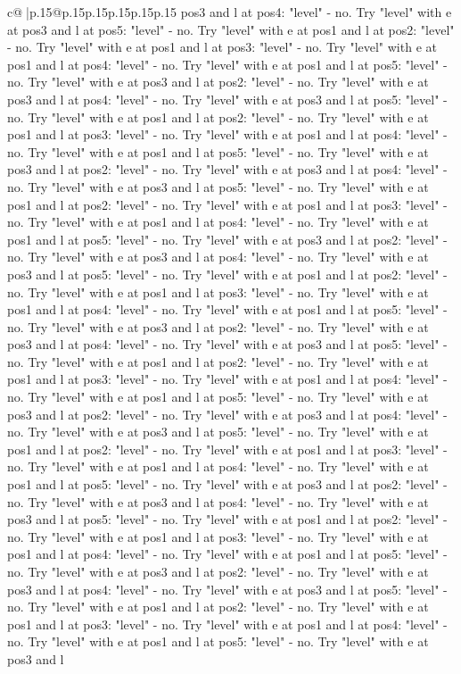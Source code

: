 \documentclass{article}
\begin{document}
{\begin{supertabular}{c@{$\;$}|p{.15\linewidth}@{}p{.15\linewidth}p{.15\linewidth}p{.15\linewidth}p{.15\linewidth}p{.15\linewidth}}
{{{pos3 and l at pos4: "level" {-} no. Try "level" with e at pos3 and l at pos5: "level" {-} no. Try "level" with e at pos1 and l at pos2: "level" {-} no. Try "level" with e at pos1 and l at pos3: "level" {-} no. Try "level" with e at pos1 and l at pos4: "level" {-} no. Try "level" with e at pos1 and l at pos5: "level" {-} no. Try "level" with e at pos3 and l at pos2: "level" {-} no. Try "level" with e at pos3 and l at pos4: "level" {-} no. Try "level" with e at pos3 and l at pos5: "level" {-} no. Try "level" with e at pos1 and l at pos2: "level" {-} no. Try "level" with e at pos1 and l at pos3: "level" {-} no. Try "level" with e at pos1 and l at pos4: "level" {-} no. Try "level" with e at pos1 and l at pos5: "level" {-} no. Try "level" with e at pos3 and l at pos2: "level" {-} no. Try "level" with e at pos3 and l at pos4: "level" {-} no. Try "level" with e at pos3 and l at pos5: "level" {-} no. Try "level" with e at pos1 and l at pos2: "level" {-} no. Try "level" with e at pos1 and l at pos3: "level" {-} no. Try "level" with e at pos1 and l at pos4: "level" {-} no. Try "level" with e at pos1 and l at pos5: "level" {-} no. Try "level" with e at pos3 and l at pos2: "level" {-} no. Try "level" with e at pos3 and l at pos4: "level" {-} no. Try "level" with e at pos3 and l at pos5: "level" {-} no. Try "level" with e at pos1 and l at pos2: "level" {-} no. Try "level" with e at pos1 and l at pos3: "level" {-} no. Try "level" with e at pos1 and l at pos4: "level" {-} no. Try "level" with e at pos1 and l at pos5: "level" {-} no. Try "level" with e at pos3 and l at pos2: "level" {-} no. Try "level" with e at pos3 and l at pos4: "level" {-} no. Try "level" with e at pos3 and l at pos5: "level" {-} no. Try "level" with e at pos1 and l at pos2: "level" {-} no. Try "level" with e at pos1 and l at pos3: "level" {-} no. Try "level" with e at pos1 and l at pos4: "level" {-} no. Try "level" with e at pos1 and l at pos5: "level" {-} no. Try "level" with e at pos3 and l at pos2: "level" {-} no. Try "level" with e at pos3 and l at pos4: "level" {-} no. Try "level" with e at pos3 and l at pos5: "level" {-} no. Try "level" with e at pos1 and l at pos2: "level" {-} no. Try "level" with e at pos1 and l at pos3: "level" {-} no. Try "level" with e at pos1 and l at pos4: "level" {-} no. Try "level" with e at pos1 and l at pos5: "level" {-} no. Try "level" with e at pos3 and l at pos2: "level" {-} no. Try "level" with e at pos3 and l at pos4: "level" {-} no. Try "level" with e at pos3 and l at pos5: "level" {-} no. Try "level" with e at pos1 and l at pos2: "level" {-} no. Try "level" with e at pos1 and l at pos3: "level" {-} no. Try "level" with e at pos1 and l at pos4: "level" {-} no. Try "level" with e at pos1 and l at pos5: "level" {-} no. Try "level" with e at pos3 and l at pos2: "level" {-} no. Try "level" with e at pos3 and l at pos4: "level" {-} no. Try "level" with e at pos3 and l at pos5: "level" {-} no. Try "level" with e at pos1 and l at pos2: "level" {-} no. Try "level" with e at pos1 and l at pos3: "level" {-} no. Try "level" with e at pos1 and l at pos4: "level" {-} no. Try "level" with e at pos1 and l at pos5: "level" {-} no. Try "level" with e at pos3 and l }}}
\end{supertabular}}
\end{document}
